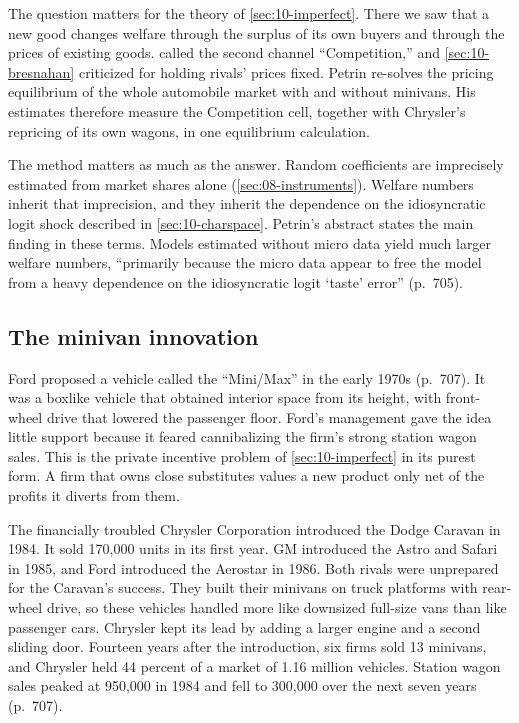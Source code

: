 The question matters for the theory of \cref{sec:10-imperfect}. There we saw that a new good changes welfare through
the surplus of its own buyers and through the prices of existing goods.  called the second
channel ``Competition,'' and \cref{sec:10-bresnahan} criticized \citet{Hausman1997} for holding rivals' prices fixed.
Petrin re-solves the pricing equilibrium of the whole automobile market with and without minivans. His estimates
therefore measure the Competition cell, together with Chrysler's repricing of its own wagons, in one equilibrium
calculation.

The method matters as much as the answer. Random coefficients are imprecisely estimated from market shares alone
(\cref{sec:08-instruments}). Welfare numbers inherit that imprecision, and they inherit the dependence on the
idiosyncratic logit shock described in \cref{sec:10-charspace}. Petrin's abstract states the main finding in these
terms. Models estimated without micro data yield much larger welfare numbers, ``primarily because the micro data
appear to free the model from a heavy dependence on the idiosyncratic logit `taste' error'' (p.~705).

\subsection{The minivan innovation}\label{sec:10-petrin-setting}

Ford proposed a vehicle called the ``Mini/Max'' in the early 1970s (p.~707). It was a boxlike vehicle that obtained
interior space from its height, with front-wheel drive that lowered the passenger floor. Ford's management gave the
idea little support because it feared cannibalizing the firm's strong station wagon sales. This is the private
incentive problem of \cref{sec:10-imperfect} in its purest form. A firm that owns close substitutes values a new
product only net of the profits it diverts from them.

The financially troubled Chrysler Corporation introduced the Dodge Caravan in 1984. It sold 170,000 units in its first
year. GM introduced the Astro and Safari in 1985, and Ford introduced the Aerostar in 1986. Both rivals were unprepared
for the Caravan's success. They built their minivans on truck platforms with rear-wheel drive, so these vehicles
handled more like downsized full-size vans than like passenger cars. Chrysler kept its lead by adding a larger engine
and a second sliding door. Fourteen years after the introduction, six firms sold 13 minivans, and Chrysler held 44
percent of a market of 1.16 million vehicles. Station wagon sales peaked at 950,000 in 1984 and fell to 300,000 over
the next seven years (p.~707).

